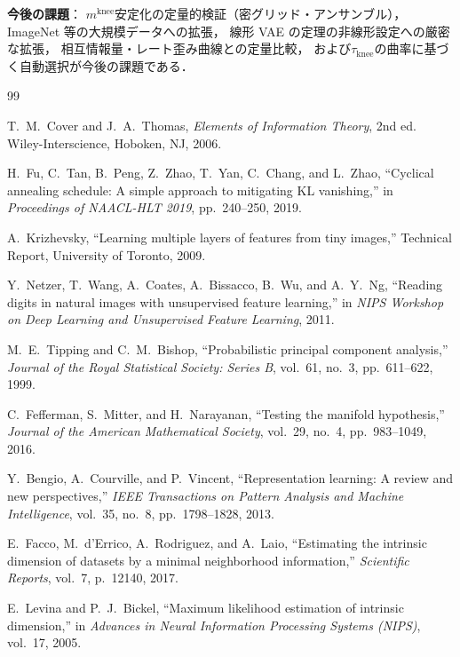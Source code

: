 \documentclass[11pt,a4paper]{jsarticle}
\newcommand{\mknee}{m^{\mathrm{knee}}}
\begin{document}
\textbf{今後の課題}：
$\mknee$安定化の定量的検証（密グリッド・アンサンブル），
ImageNet 等の大規模データへの拡張，
線形 VAE の定理の非線形設定への厳密な拡張，
相互情報量・レート歪み曲線との定量比較，
および$\tau_{\mathrm{knee}}$の曲率に基づく自動選択が今後の課題である．

\begin{thebibliography}{99}

T.~M.~Cover and J.~A.~Thomas,
\textit{Elements of Information Theory}, 2nd ed.
Wiley-Interscience, Hoboken, NJ, 2006.

H.~Fu, C.~Tan, B.~Peng, Z.~Zhao, T.~Yan, C.~Chang, and L.~Zhao,
``Cyclical annealing schedule: A simple approach to mitigating {KL} vanishing,''
in \textit{Proceedings of NAACL-HLT 2019}, pp.~240--250, 2019.

A.~Krizhevsky,
``Learning multiple layers of features from tiny images,''
Technical Report, University of Toronto, 2009.

Y.~Netzer, T.~Wang, A.~Coates, A.~Bissacco, B.~Wu, and A.~Y.~Ng,
``Reading digits in natural images with unsupervised feature learning,''
in \textit{NIPS Workshop on Deep Learning and Unsupervised Feature Learning}, 2011.

M.~E.~Tipping and C.~M.~Bishop,
``Probabilistic principal component analysis,''
\textit{Journal of the Royal Statistical Society: Series B}, vol.~61, no.~3,
pp.~611--622, 1999.

C.~Fefferman, S.~Mitter, and H.~Narayanan,
``Testing the manifold hypothesis,''
\textit{Journal of the American Mathematical Society}, vol.~29, no.~4,
pp.~983--1049, 2016.

Y.~Bengio, A.~Courville, and P.~Vincent,
``Representation learning: A review and new perspectives,''
\textit{IEEE Transactions on Pattern Analysis and Machine Intelligence},
vol.~35, no.~8, pp.~1798--1828, 2013.

E.~Facco, M.~d'Errico, A.~Rodriguez, and A.~Laio,
``Estimating the intrinsic dimension of datasets by a minimal neighborhood information,''
\textit{Scientific Reports}, vol.~7, p.~12140, 2017.

E.~Levina and P.~J.~Bickel,
``Maximum likelihood estimation of intrinsic dimension,''
in \textit{Advances in Neural Information Processing Systems (NIPS)}, vol.~17, 2005.


\end{thebibliography}
\end{document}
